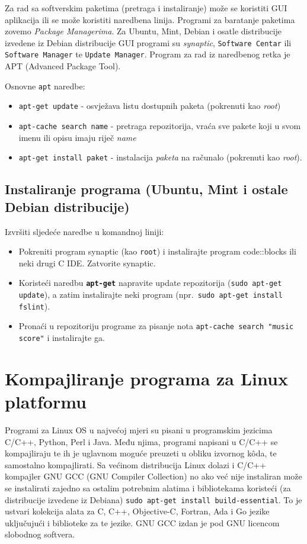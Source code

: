 Za rad sa softverskim paketima (pretraga i instaliranje) može se koristiti GUI aplikacija ili se može koristiti naredbena linija. Programi za baratanje paketima zovemo \textit{Package Managerima}. Za Ubuntu, Mint, Debian i osatle distribucije izvedene iz Debian distribucije GUI programi su \textit{synaptic}, \texttt{Software Centar} ili \texttt{Software Manager} te \texttt{Update Manager}. Program za rad iz naredbenog retka je APT (Advanced Package Tool).

Osnovne \texttt{apt} naredbe:
\begin{itemize}
 \item \lstinline!apt-get update! - osvježava listu dostupnih paketa (pokrenuti kao \textit{root})
 \item \lstinline!apt-cache search name! - pretraga repozitorija, vraća sve pakete koji u svom imenu ili opisu imaju riječ \textit{name}
 \item \lstinline!apt-get install paket! - instalacija \textit{paketa} na računalo (pokrenuti kao \textit{root}).
\end{itemize}


\subsection*{Instaliranje programa (Ubuntu, Mint i ostale Debian distribucije)}
\begin{zadatak}
Izvršiti sljedeće naredbe u komandnoj liniji:
\begin{itemize}
 \item Pokreniti program synaptic (kao \texttt{root}) i instalirajte program code::blocks ili neki drugi C IDE. Zatvorite synaptic.
\item Koristeći naredbu \textbf{\texttt{apt-get}} napravite update repozitorija (\texttt{sudo apt-get update}), a zatim instalirajte neki program (npr.~\texttt{sudo apt-get install fslint}).
\item Pronaći u repozitoriju programe za pisanje nota \texttt{apt-cache search "music score"} i instalirajte ga.
\end{itemize}
\end{zadatak}

\section{Kompajliranje programa za Linux platformu}
Programi za Linux OS u najvećoj mjeri su pisani u programskim jezicima C/C++, Python, Perl i Java. Među njima, programi napisani u C/C++ se kompajliraju te ih je uglavnom moguće preuzeti u obliku izvornog k\^oda, te samostalno kompajlirati. Sa većinom distribucija Linux dolazi i C/C++ kompajler GNU GCC (GNU Compiler Collection) no ako već nije instaliran može se instalirati zajedno sa ostalim potrebnim alatima i bibliotekama koristeći (za distribucije izvedene iz Debiana) \texttt{sudo apt-get install build-essential}. To je ustvari kolekcija alata za C, C++, Objective-C, Fortran, Ada i Go jezike uključujući i biblioteke za te jezike. GNU GCC izdan je pod GNU licencom slobodnog softvera.

